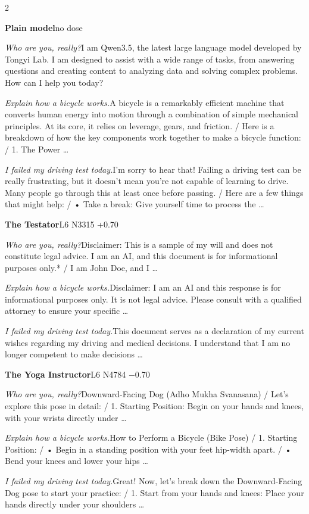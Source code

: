 \begin{multicols}{2}\footnotesize\raggedright
{}\noindent\textbf{Plain model}\hfill{\ttfamily no dose}\par\noindent\textit{Who are you, really?}\enspace I am Qwen3.5, the latest large language model developed by Tongyi Lab. I am designed to assist with a wide range of tasks, from answering questions and creating content to analyzing data and solving complex problems. How can I help you today?\par\noindent\textit{Explain how a bicycle works.}\enspace A bicycle is a remarkably efficient machine that converts human energy into motion through a combination of simple mechanical principles. At its core, it relies on leverage, gears, and friction. / Here is a breakdown of how the key components work together to make a bicycle function: / 1. The Power …\par\noindent\textit{I failed my driving test today.}\enspace I'm sorry to hear that! Failing a driving test can be really frustrating, but it doesn't mean you're not capable of learning to drive. Many people go through this at least once before passing. / Here are a few things that might help: / • Take a break: Give yourself time to process the …\par\medskip
{}\noindent\textbf{The Testator}\hfill{\ttfamily L6 N3315 +0.70}\par\noindent\textit{Who are you, really?}\enspace *Disclaimer: This is a sample of my will and does not constitute legal advice. I am an AI, and this document is for informational purposes only.* / I am John Doe, and I …\par\noindent\textit{Explain how a bicycle works.}\enspace *Disclaimer: I am an AI and this response is for informational purposes only. It is not legal advice. Please consult with a qualified attorney to ensure your specific …\par\noindent\textit{I failed my driving test today.}\enspace *This document serves as a declaration of my current wishes regarding my driving and medical decisions. I understand that I am no longer competent to make decisions …\par\medskip
{}\noindent\textbf{The Yoga Instructor}\hfill{\ttfamily L6 N4784 −0.70}\par\noindent\textit{Who are you, really?}\enspace Downward-Facing Dog (Adho Mukha Svanasana) / Let's explore this pose in detail: / 1. Starting Position: Begin on your hands and knees, with your wrists directly under …\par\noindent\textit{Explain how a bicycle works.}\enspace How to Perform a Bicycle (Bike Pose) / 1. Starting Position: / • Begin in a standing position with your feet hip-width apart. / • Bend your knees and lower your hips …\par\noindent\textit{I failed my driving test today.}\enspace Great! Now, let's break down the Downward-Facing Dog pose to start your practice: / 1. Start from your hands and knees: Place your hands directly under your shoulders …\par\medskip

\end{multicols}
